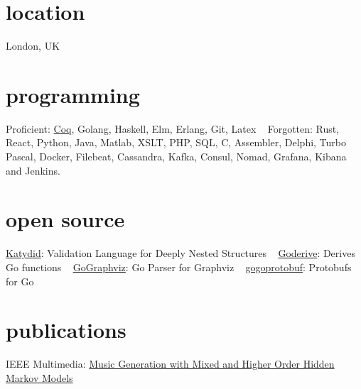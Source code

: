 \documentclass[print]{friggeri-cv-a4} %
\begin{document}

\begin{aside} %
\section{location}
London, UK
\section{programming}
Proficient: 
\href{https://coq.inria.fr/}{Coq}, Golang, Haskell, Elm, Erlang, Git, Latex
~
Forgotten:
Rust, React, Python, Java, Matlab, XSLT, PHP, SQL, C, Assembler, Delphi, Turbo Pascal, Docker, Filebeat, Cassandra, Kafka, Consul, Nomad, Grafana, Kibana and Jenkins.
\section{open source}
\href{https://github.com/katydid/katydid}{Katydid}: Validation Language for Deeply Nested Structures
~
\href{https://github.com/awalterschulze/goderive}{Goderive}: Derives Go functions
~
\href{https://github.com/awalterschulze/gographviz}{GoGraphviz}: Go Parser for Graphviz
~
\href{https://github.com/gogo/protobuf}{gogoprotobuf}: Protobufs for Go
\section{publications}
IEEE Multimedia: \href{http://doi.ieeecomputersociety.org/10.1109/MMUL.2010.44}{Music Generation with Mixed and Higher Order Hidden Markov Models}
\end{aside}
\end{document}
